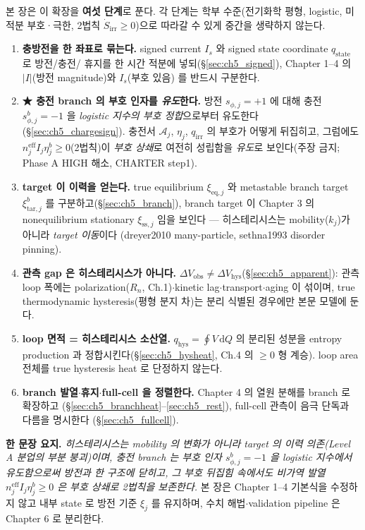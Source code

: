 \documentclass[11pt,a4paper]{article}
\newcommand{\dd}{\mathrm{d}}
\newcommand{\eff}{\mathrm{eff}}
\newcommand{\eq}{\mathrm{eq}}
\newcommand{\irr}{\mathrm{irr}}
\newcommand{\hys}{\mathrm{hys}}
\newcommand{\obs}{\mathrm{obs}}
\newcommand{\tar}{\mathrm{tar}}
\newcommand{\stt}{\mathrm{state}}
\newcommand{\sstat}{\mathrm{ss}}
\begin{document}
본 장은 이 확장을 \textbf{여섯 단계}로 푼다. 각 단계는 학부 수준(전기화학 평형, logistic, 미적분 부호·극한,
2법칙 $\dot S_\irr\ge0$)으로 따라갈 수 있게 중간을 생략하지 않는다.
\begin{enumerate}[label=\textbf{(\arabic*)},leftmargin=2.2em]
\item \textbf{충방전을 한 좌표로 묶는다.} signed current $I_s$ 와 signed state coordinate $q_\stt$ 로 방전/충전/
  휴지를 한 시간 적분에 넣되(\S\ref{sec:ch5_signed}), Chapter 1--4 의 $|I|$(방전 magnitude)와 $I_s$(부호 있음)
  를 반드시 구분한다.
\item \textbf{★ 충전 branch 의 부호 인자를 \emph{유도}한다.} 방전 $s_{\phi,j}=+1$ 에 대해 충전
  $s_{\phi,j}^b=-1$ 을 \emph{logistic 지수의 부호 정합}으로부터 유도한다(\S\ref{sec:ch5_chargesign}). 충전서
  $\mathcal A_j$, $\eta_j$, $q_\irr$ 의 부호가 어떻게 뒤집히고, 그럼에도 $n_j^{\eff}I_j\eta_j^b\ge0$(2법칙)이
  \emph{부호 상쇄}로 여전히 성립함을 \emph{유도}로 보인다(주장 금지; Phase A HIGH 해소, CHARTER step1).
\item \textbf{target 이 이력을 얻는다.} true equilibrium $\xi_{\eq,j}$ 와 metastable branch target
  $\xi_{\tar,j}^b$ 를 구분하고(\S\ref{sec:ch5_branch}), branch target 이 Chapter 3 의 nonequilibrium
  stationary $\xi_{\sstat,j}$ 임을 보인다 — 히스테리시스는 mobility($k_j$)가 아니라 \emph{target 이동}이다
  (dreyer2010 many-particle, sethna1993 disorder pinning).
\item \textbf{관측 gap 은 히스테리시스가 아니다.} $\Delta V_\obs\ne\Delta V_\hys$(\S\ref{sec:ch5_apparent}):
  관측 loop 폭에는 polarization($R_n$, Ch.1)$\cdot$kinetic lag$\cdot$transport$\cdot$aging 이 섞이며, true
  thermodynamic hysteresis(평형 분지 차)는 분리 식별된 경우에만 본문 모델에 둔다.
\item \textbf{loop 면적 = 히스테리시스 소산열.} $q_\hys=\oint V\,\dd Q$ 의 분리된 성분을 entropy production
  과 정합시킨다(\S\ref{sec:ch5_hysheat}, Ch.4 의 $\ge0$ 형 계승). loop area 전체를 true hysteresis heat 로
  단정하지 않는다.
\item \textbf{branch 발열$\cdot$휴지$\cdot$full-cell 을 정렬한다.} Chapter 4 의 열원 분해를 branch 로 확장하고
  (\S\ref{sec:ch5_branchheat}--\ref{sec:ch5_rest}), full-cell 관측이 음극 단독과 다름을 명시한다
  (\S\ref{sec:ch5_fullcell}).
\end{enumerate}

\noindent\textbf{한 문장 요지.} \emph{히스테리시스는 mobility 의 변화가 아니라 target 의 이력 의존(Level A
분업의 부분 붕괴)이며, 충전 branch 는 부호 인자 $s_{\phi,j}^b=-1$ 을 logistic 지수에서 \emph{유도}함으로써
방전과 한 구조에 닫히고, 그 부호 뒤집힘 속에서도 비가역 발열 $n_j^{\eff}I_j\eta_j^b\ge0$ 은 부호 상쇄로
2법칙을 보존한다.} 본 장은 Chapter 1--4 기본식을 수정하지 않고 내부 state 로 방전 기준 $\xi_j$ 를 유지하며,
수치 해법$\cdot$validation pipeline 은 Chapter 6 로 분리한다.
\end{document}
